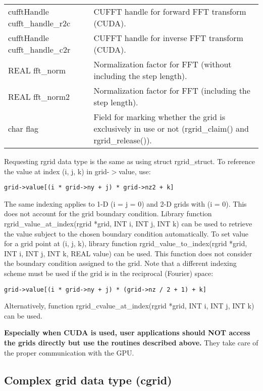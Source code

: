 \documentclass[12pt,letterpaper]{report}
\begin{document}
\begin{longtable}{p{} p{}}
cufftHandle cufft\_handle\_r2c & CUFFT handle for forward FFT transform (CUDA).\\
cufftHandle cufft\_handle\_c2r & CUFFT handle for inverse FFT transform (CUDA).\\
REAL fft\_norm & Normalization factor for FFT (without including the step length).\\
REAL fft\_norm2 & Normalization factor for FFT (including the step length).\\
char flag & Field for marking whether the grid is exclusively in use or not (rgrid\_claim() and rgrid\_release()).\\
\end{longtable}

\noindent
Requesting rgrid data type is the same as using struct rgrid\_struct. To reference the value at index (i, j, k) in grid-$>$value, use:
\begin{verbatim}
grid->value[(i * grid->ny + j) * grid->nz2 + k]
\end{verbatim}
The same indexing applies to 1-D (i = j = 0) and 2-D grids with (i = 0). This does not account for the grid boundary condition. Library function rgrid\_value\_at\_index(rgrid *grid, INT i, INT j, INT k) can be used to retrieve the value subject to the chosen boundary condition automatically. To set value for a grid point at (i, j, k), library function rgrid\_value\_to\_index(rgrid *grid, INT i, INT j, INT k, REAL value) can be used. This function does not consider the boundary condition assigned to the grid. Note that a different indexing scheme must be used if the grid is in the reciprocal (Fourier) space:
\begin{verbatim}
grid->value[(i * grid->ny + j) * (grid->nz / 2 + 1) + k]
\end{verbatim}
Alternatively, function rgrid\_cvalue\_at\_index(rgrid *grid, INT i, INT j, INT k) can be used.

\noindent
\textbf{Especially when CUDA is used, user applications should NOT access the grids directly but use the routines described above.} They take care of the proper communication with the GPU.


\subsection{Complex grid data type (cgrid)}
\end{document}
